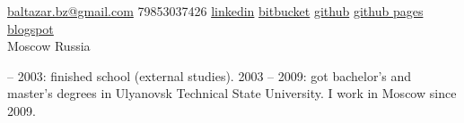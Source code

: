 \documentclass[unicode, 10pt, a4paper, oneside, fleqn]{article}
\begin{document}
\sloppy  %


\nobreakvspace{0.3em}  %

\noindent\href{mailto:baltazar.bz@gmail.com}{baltazar.bz\mbox{}@\mbox{}gmail.com}\sbull
\textsmaller{+}79853037426\sbull
\href{http://ru.linkedin.com/pub/yuri-bochkarev/21/3a9/555}{linkedin}
\sbull
\href{https://bitbucket.org/balta2ar}{bitbucket}
\sbull
\href{https://github.com/balta2ar}{github}
\sbull
\href{http://balta2ar.github.com}{github pages}
\sbull
\href{http://baltazar-bz.blogspot.com/}{blogspot}
\\
Moscow\sbull
Russia



 -- 2003: finished school (external studies).
2003 -- 2009: got bachelor's and master's degrees in Ulyanovsk Technical State
University. I work in Moscow since 2009.

\end{document}
